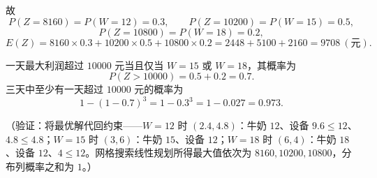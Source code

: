 \begin{answer}
故
\nopagebreak[4]
\[
P(Z=8160)=P(W=12)=0.3,\qquad
P(Z=10200)=P(W=15)=0.5,
\]
\nopagebreak[4]
\[
P(Z=10800)=P(W=18)=0.2,
\]
\nopagebreak[4]
\[
E(Z)=8160\times0.3+10200\times0.5+10800\times0.2
=2448+5100+2160=9708\ (\text{元}).
\]


一天最大利润超过 \(10000\) 元当且仅当 \(W=15\) 或 \(W=18\)，其概率为
\nopagebreak[4]
\[
P(Z>10000)=0.5+0.2=0.7.
\]
三天中至少有一天超过 \(10000\) 元的概率为
\nopagebreak[4]
\[
1-(1-0.7)^3=1-0.3^3=1-0.027=0.973.
\]

（验证：将最优解代回约束——\(W=12\) 时 \((2.4,4.8)\)：牛奶 \(12\)、设备 \(9.6\leqslant12\)、\(4.8\leqslant4.8\)；\(W=15\) 时 \((3,6)\)：牛奶 \(15\)、设备 \(12\)；\(W=18\) 时 \((6,4)\)：牛奶 \(18\)、设备 \(12\)、\(4\leqslant12\)。网格搜索线性规划所得最大值依次为 \(8160,10200,10800\)，分布列概率之和为 \(1\)。）



\end{answer}
